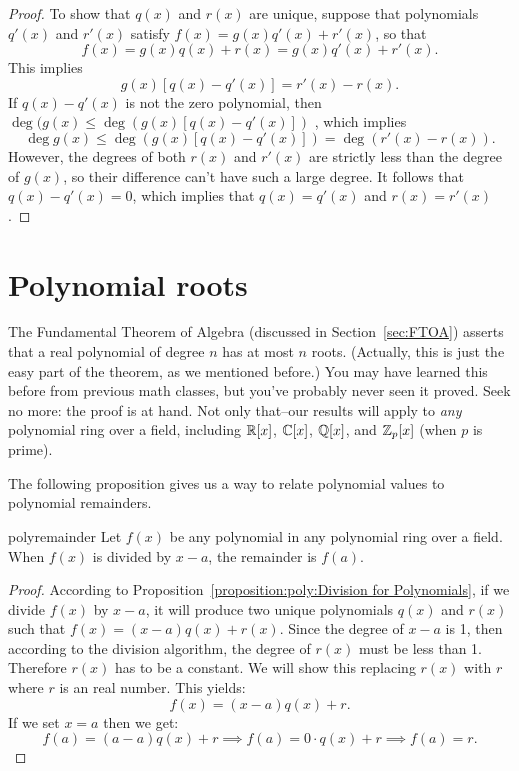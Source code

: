 \begin{proof}
To show that  $q(x)$ and $r(x)$ are unique, suppose that polynomials $q'(x)$ and $r'(x)$ satisfy $f(x) = g(x) q'(x)
+ r'(x)$, so that
\[
f(x) = g(x) q(x) + r(x) = g(x) q'(x) + r'(x).
\]
This implies
\[
g(x) [q(x) - q'(x) ] = r'(x) - r(x).
\]
If $q(x) - q'(x)$ is not the zero polynomial, then $ \deg( g(x) \leq \deg( g(x) [q(x) - q'(x) ])$ , which implies
\[
\deg g(x) \leq \deg( g(x) [q(x) - q'(x) ] )= \deg( r'(x) - r(x) ).
\]
However, the degrees of both $r(x)$ and $r'(x)$ are strictly less than
the degree of $g(x)$, so their difference can't have such a large degree.  It follows that $q(x) - q'(x) = 0$, which implies that $q(x)=q'(x)$ and $r(x)=r'(x)$.
\end{proof}

\section{Polynomial roots\quad
{}}
The Fundamental Theorem of Algebra (discussed in Section~\ref{sec:FTOA}) asserts that a real polynomial of degree $n$ has at most $n$ roots. (Actually, this is just the easy part of the theorem, as we mentioned before.) You may have learned this before from previous math classes, but you've probably never seen it proved. Seek no more: the proof is at hand. Not only that--our results will apply to  \emph{any} polynomial ring over a field, including $\mathbb{R}[x]$, $\mathbb{C}[x]$, $\mathbb{Q}[x]$, and $\mathbb{Z}_p[x]$ (when $p$ is prime).  

The following proposition gives us a way to relate polynomial values to polynomial remainders.

\begin {prop}{polyremainder}
Let $f(x)$ be any polynomial in any polynomial ring over a field. When $f(x)$ is divided by $x-a$, the remainder is $f(a)$.
\end {prop}

\begin {proof}
According to Proposition~\ref{proposition:poly:Division for Polynomials}, if we divide $f(x)$ by $x-a$, it will produce two unique polynomials $q(x)$ and $r(x)$ such that $f(x) = (x-a)q(x) + r(x)$.  Since the degree of $x-a$ is 1, then according to the division algorithm, the degree of $r(x)$ must be less than 1.  Therefore $r(x)$ has to be a constant.  We will show this replacing $r(x)$ with $r$ where $r$ is an real number.  This yields:
\[f(x) = (x-a)q(x) + r.\]
If we set $x=a$ then we get:
\[f(a) = (a-a)q(x) + r \implies f(a) = 0 \cdot q(x) + r \implies f(a) = r.\]
\end {proof}

